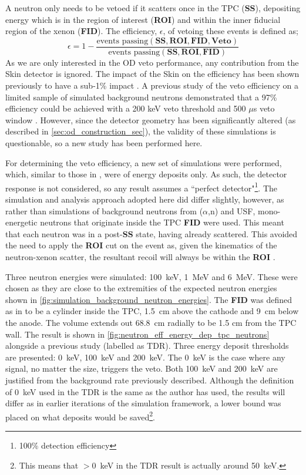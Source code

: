 \par
A neutron only needs to be vetoed if it scatters once in the TPC (\textbf{SS}), depositing energy which is in the region of interest (\textbf{ROI}) and within the inner fiducial region of the xenon (\textbf{FID}).
The efficiency, $\epsilon$, of vetoing these events is defined as;
\begin{equation}
    \epsilon = 1 - \frac{\text{events passing}(\mathbf{SS, ROI, FID, Veto})}{\text{events passing}(\mathbf{SS, ROI, FID})}
    \label{eq:neutron_efficiency}
\end{equation}
As we are only interested in the OD veto performance, any contribution from the Skin detector is ignored.
The impact of the Skin on the efficiency has been shown previously to have a sub-1\% impact \cite{sallyshaw_thesis_ref}.
A previous study of the veto efficiency on a limited sample of simulated background neutrons demonstrated that a 97\% efficiency could be achieved with a 200 keV veto threshold and 500 $\mu$s veto window \cite{LZ_TechnicalDesignReview_ref}.
However, since the detector geometry has been significantly altered (as described in \autoref{sec:od_construction_sec}), the validity of these simulations is questionable, so a new study has been performed here.
\par
For determining the veto efficiency, a new set of simulations were performed, which, similar to those in \cite{LZ_TechnicalDesignReview_ref}, were of energy deposits only.
As such, the detector response is not considered, so any result assumes a ``perfect detector"\footnote{100\% detection efficiency}.
The simulation and analysis approach adopted here did differ slightly, however, as rather than simulations of background neutrons from ($\alpha$,n) and USF, mono-energetic neutrons that originate inside the TPC \textbf{FID} were used.
This meant that each neutron was in a post-\textbf{SS} state, having already scattered.
This avoided the need to apply the \textbf{ROI} cut on the event as, given the kinematics of the neutron-xenon scatter, the resultant recoil will always be within the \textbf{ROI} \cite{xenon100_neutrons_ref}.
\par
Three neutron energies were simulated: 100~keV, 1~MeV and 6~MeV.
These were chosen as they are close to the extremities of the expected neutron energies shown in \autoref{fig:simulation_background_neutron_energies}.
The \textbf{FID} was defined as in \cite{LZ_TechnicalDesignReview_ref} to be a cylinder inside the TPC, 1.5~cm above the cathode and 9~cm below the anode.
The volume extends out 68.8~cm radially to be 1.5 cm from the TPC wall.
The result is shown in \autoref{fig:neutron_eff_energy_dep_tpc_neutrons} alongside a previous study (labelled as TDR).
Three energy deposit thresholds are presented: 0~keV, 100~keV and 200~keV.
The 0~keV is the case where any signal, no matter the size, triggers the veto.
Both 100~keV and 200~keV are justified from the background rate previously described.
Although the definition of 0~keV used in the TDR is the same as the author has used, the results will differ as in earlier iterations of the simulation framework, a lower bound was placed on what deposits would be saved\footnote{This means that $>$0~keV in the TDR result is actually around 50~keV.}.

